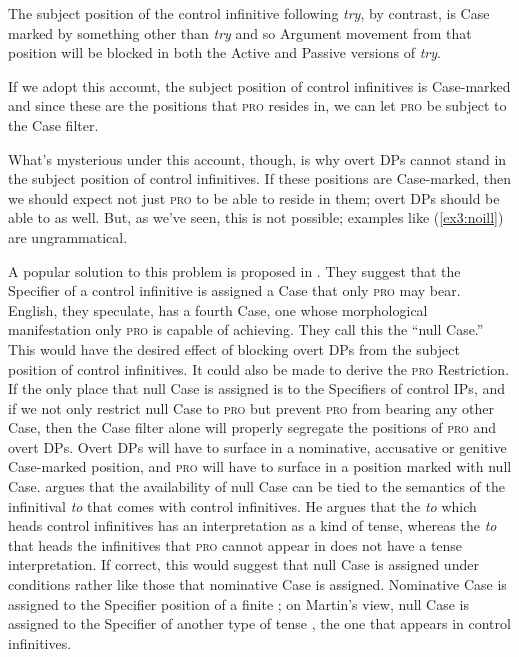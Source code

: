 The subject position of the control infinitive following \emph{try}, by contrast, is Case marked by something other than \emph{try} and so Argument movement from that position will be blocked in both the Active and Passive versions of \emph{try}.
\begin{exe}
\ex \label{ex3:tryill} 
\begin{xlist}

\end{xlist}
\end{exe}
If we adopt this account, the subject position of control infinitives is Case-marked and since these are the positions that \textsc{pro} resides in, we can let \textsc{pro} be subject to the Case filter.

What's mysterious under this account, though, is why overt DPs cannot stand in the subject position of control infinitives. If these positions are Case-marked, then we should expect not just \textsc{pro} to be able to reside in them; overt DPs should be able to as well. But, as we've seen, this is not possible; examples like (\ref{ex3:noill}) are ungrammatical.
\begin{exe}
\ex \label{ex3:noill} 
\begin{xlist}
\end{xlist}
\end{exe}
A popular solution to this problem is proposed in \citet{Chomsky:1993}. They suggest that the Specifier of a control infinitive is assigned a Case that only \textsc{pro} may bear. English, they speculate, has a fourth Case, one whose morphological manifestation only \textsc{pro} is capable of achieving. They call this the ``null Case.'' This would have the desired effect of blocking overt DPs from the subject position of control infinitives. It could also be made to derive the \textsc{pro} Restriction. If the only place that null Case is assigned is to the Specifiers of control IPs, and if we not only restrict null Case to \textsc{pro} but prevent \textsc{pro} from bearing any other Case, then the Case filter alone will properly segregate the positions of \textsc{pro} and overt DPs. Overt DPs will have to surface in a nominative, accusative or genitive Case-marked position, and \textsc{pro} will have to surface in a position marked with null Case. \citet{Martin:1992,Martin:2001} argues that the availability of null Case can be tied to the semantics of the infinitival \emph{to} that comes with control infinitives. He argues that the \emph{to} which heads control infinitives has an interpretation as a kind of tense, whereas the \emph{to} that heads the infinitives that \textsc{pro} cannot appear in does not have a tense interpretation. If correct, this would suggest that null Case is assigned under conditions rather like those that nominative Case is assigned. Nominative Case is assigned to the Specifier position of a finite ; on Martin's view, null Case is assigned to the Specifier of another type of tense , the one that appears in control infinitives.

